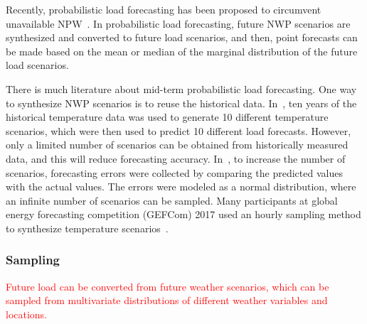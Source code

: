 \documentclass[journal]{IEEEtran} %
\begin{document}
Recently, probabilistic load forecasting has been proposed to circumvent unavailable NPW~\cite{Xie2016a}. In probabilistic load forecasting, future NWP scenarios are synthesized and converted to future load scenarios, and then, point forecasts can be made based on the mean or median of the marginal distribution of the future load scenarios.







There is much literature about mid-term probabilistic load forecasting. One way to synthesize NWP scenarios is to reuse the historical data. In~\cite{Hong2014}, ten years of the historical temperature data was used to generate 10 different temperature scenarios, which were then used to predict 10 different load forecasts. However, only a limited number of scenarios can be obtained from historically measured data, and this will reduce forecasting accuracy. In~\cite{Xie2017}, to increase the number of scenarios, forecasting errors were collected by comparing the predicted values with the actual values. The errors were modeled as a normal distribution, where an infinite number of scenarios can be sampled.  Many participants at global energy forecasting competition (GEFCom) 2017 used an hourly sampling method to synthesize temperature scenarios~\cite{Hong2019}. 


\vspace{1in}







\subsubsection{Sampling}
\textcolor{red}{Future load can be converted from future weather scenarios, which can be sampled from multivariate distributions of different weather variables and locations.}



\vspace{1in}
\end{document}
